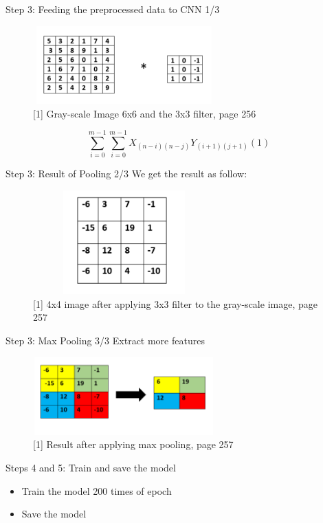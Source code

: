 \documentclass{beamer}
\begin{document}
\begin{frame}{Step 3: Feeding the preprocessed data to CNN 1/3}
\begin{figure}[H]
    \includegraphics[width=7cm,height=3cm]{images/convolution.png}
    \caption{[1] Gray-scale Image 6x6 and the 3x3 filter, page 256}
    \label{fig:L1}
\end{figure}
$$ \sum_{i=0}^{m-1}\sum_{i=0}^{m-1} X_{(n-i)(n-j)}Y_{(i+1)(j+1)}    (1)$$
\end{frame} 

\begin{frame}{Step 3: Result of Pooling 2/3}
We get the result as follow:
\begin{figure}[H]
    \includegraphics[width=7cm,height=4cm]{images/pooling.png}
    \caption{[1] 4x4 image after applying 3x3 filter to the gray-scale image, page 257}
    \label{fig:L1}
\end{figure}
\end{frame} 

\begin{frame}{Step 3: Max Pooling 3/3}
Extract more features
\begin{figure}[H]
    \includegraphics[width=7cm,height=3cm]{images/maxpooling.png}
    \caption{[1] Result after applying max pooling, page 257}
    \label{fig:L1}
\end{figure}
\end{frame} 

\begin{frame}{Steps 4 and 5: Train and save the model}
\begin{itemize}
		\item  Train the model 200 times of epoch
		\item Save the model 
\end{itemize}
\end{frame} 
\end{document}
